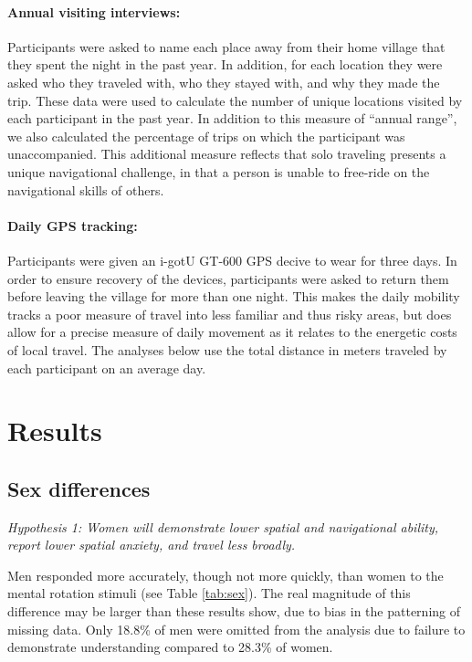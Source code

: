 \paragraph{Annual visiting interviews:}  Participants were asked to name each place away from their home village that they spent the night in the past year.  In addition, for each location they were asked who they traveled with, who they stayed with, and why they made the trip.  These data were used to calculate the number of unique locations visited by each participant in the past year.  In addition to this measure of ``annual range'', we also calculated the percentage of trips on which the participant was unaccompanied.  This additional measure reflects that solo traveling presents a unique navigational challenge, in that a person is unable to free-ride on the navigational skills of others.

\paragraph{Daily GPS tracking:}  Participants were given an i-gotU GT-600 GPS decive to wear for three days.  In order to ensure recovery of the devices, participants were asked to return them before leaving the village for more than one night.  This makes the daily mobility tracks a poor measure of travel into less familiar and thus risky areas, but does allow for a precise measure of daily movement as it relates to the energetic costs of local travel.  The analyses below use the total distance in meters traveled by each participant on an average day. 

\section{Results}
\label{sec:3}
	\subsection{Sex differences}
	\label{sec:3.1}
	
\emph{Hypothesis 1: Women will demonstrate lower spatial and navigational ability, report lower spatial anxiety, and travel less broadly.}	
\smallskip

Men responded more accurately, though not more quickly, than women to the mental rotation stimuli (see Table \ref{tab:sex}).  The real magnitude of this difference may be larger than these results show, due to bias in the patterning of missing data.  Only 18.8\% of men were omitted from the analysis due to failure to demonstrate understanding compared to 28.3\% of women.

